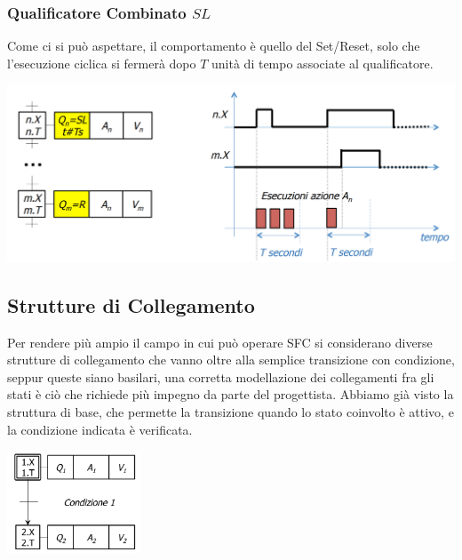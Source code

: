 \documentclass[10pt, letterpaper]{report}
\begin{document}
\subsubsection{Qualificatore Combinato $SL$}
Come ci si può aspettare, il comportamento è quello del Set/Reset, solo che l'esecuzione ciclica si fermerà dopo $T$ unità di tempo associate al qualificatore.
\begin{center}
    \includegraphics[width=1\textwidth ]{images/SLQual.png}
\end{center}
\subsection{Strutture di Collegamento}
Per rendere più ampio il campo in cui può operare SFC si considerano diverse strutture di collegamento che vanno oltre alla semplice transizione con condizione, seppur queste siano basilari, una corretta modellazione dei collegamenti fra gli stati è ciò che richiede più impegno da parte del progettista. Abbiamo già visto la struttura di base, che permette la transizione quando lo stato coinvolto è attivo, e la condizione indicata è verificata.
\begin{center}
    \includegraphics[width=0.3\textwidth ]{images/collegamentoBase.png}
\end{center}
\end{document}
